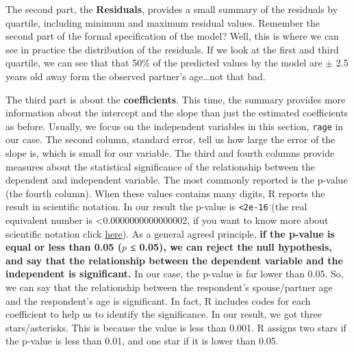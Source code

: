 \documentclass[
]{book}
\begin{document}
The second part, the \textbf{Residuals}, provides a small summary of the residuals by quartile, including minimum and maximum residual values. Remember the second part of the formal specification of the model? Well, this is where we can see in practice the distribution of the residuals. If we look at the first and third quartile, we can see that that 50\% of the predicted values by the model are \(\pm\) 2.5 years old away form the observed partner's age\ldots not that bad.

The third part is about the \textbf{coefficients}. This time, the summary provides more information about the intercept and the slope than just the estimated coefficients as before. Usually, we focus on the independent variables in this section, \texttt{rage} in our case. The second column, standard error, tell us how large the error of the slope is, which is small for our variable. The third and fourth columns provide measures about the statistical significance of the relationship between the dependent and independent variable. The most commonly reported is the p-value (the fourth column). When these values contains many digits, R reports the result in scientific notation. In our result the p-value is \texttt{\textless{}2e-16} (the real equivalent number is \textless0.0000000000000002, if you want to know more about scientific notation click \href{https://www.calculatorsoup.com/calculators/math/scientific-notation-converter.php\#:~:text=The\%20proper\%20format\%20for\%20scientific,equivalent\%20to\%20the\%20original\%20number.}{here}). As a general agreed principle, \textbf{if the p-value is equal or less than 0.05 (\(p\) ≤ 0.05), we can reject the null hypothesis, and say that the relationship between the dependent variable and the independent is significant.} In our case, the p-value is far lower than 0.05. So, we can say that the relationship between the respondent's spouse/partner age and the respondent's age is significant. In fact, R includes codes for each coefficient to help us to identify the significance. In our result, we got three stars/asterisks. This is because the value is less than 0.001. R assigns two stars if the p-value is less than 0.01, and one star if it is lower than 0.05.
\end{document}

